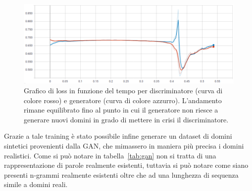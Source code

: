 \begin{figure}[!bp]
\centering
\includegraphics[width=\columnwidth]{figures/gan/ganok.png}
\caption{Grafico di loss in funzione del tempo per discriminatore (curva di colore rosso) e generatore (curva di colore azzurro). L'andamento rimane equilibrato fino al punto in cui il generatore non riesce a generare nuovi domini in grado di mettere in crisi il discriminatore. \label{fig:ganok}}
\end{figure}

Grazie a tale training è stato possibile infine generare un dataset di domini sintetici provenienti dalla GAN, che mimassero in maniera più precisa i domini realistici. Come si può notare in tabella~\ref{tab:gan} non si tratta di una rappresentazione di parole realmente esistenti, tuttavia si può notare come siano presenti n-grammi realmente esistenti oltre che ad una lunghezza di sequenza simile a domini reali.

